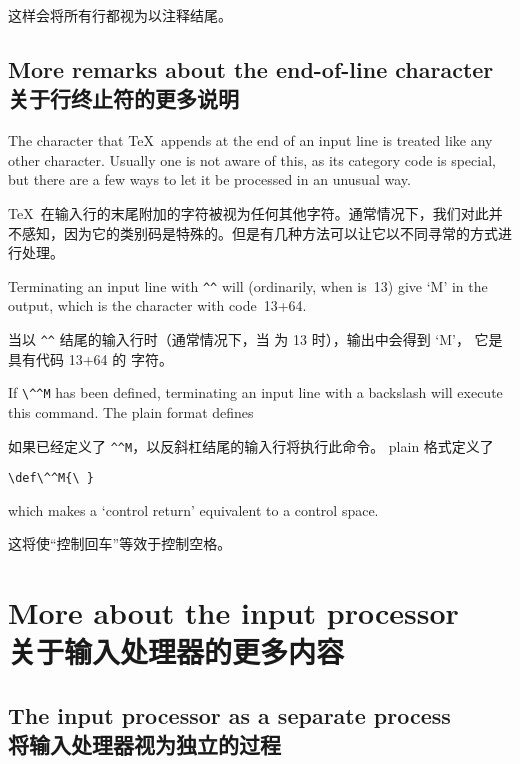 这样会将所有行都视为以注释结尾。


\subsection{More remarks about the end-of-line character\\关于行终止符的更多说明}

The character that \TeX\ appends at the end of an input line
is treated like any other character. Usually one is not aware
of this, as its category code is special, but there are a few
ways to let it be processed in an unusual way.

\TeX\ 在输入行的末尾附加的字符被视为任何其他字符。通常情况下，我们对此并不感知，因为它的类别码是特殊的。但是有几种方法可以让它以不同寻常的方式进行处理。

\begin{example} Terminating an input line with \verb>^^> will
(ordinarily, when  is~13) give `M' in the output, 
which is the 
\ascii{} character with code~13+64.

当以 \verb>^^> 结尾的输入行时（通常情况下，当  为 13 时），输出中会得到 `M'，
它是具有代码 13+64 的 \ascii{} 字符。
\end{example}

\begin{example} If \verb>\^^M> has been defined,
terminating an input line with a backslash will execute this command.
The plain format defines

如果已经定义了 \verb>^^M>，以反斜杠结尾的输入行将执行此命令。
plain 格式定义了
\begin{verbatim}
\def\^^M{\ }
\end{verbatim}
which makes a `control return' equivalent to a control space.

这将使“控制回车”等效于控制空格。
\end{example}



\section{More about the input processor\\关于输入处理器的更多内容}

\subsection{The input processor as a separate process\\将输入处理器视为独立的过程}

